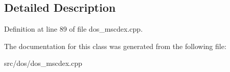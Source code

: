 \subsection{Detailed Description}


Definition at line 89 of file dos\-\_\-mscdex.\-cpp.



The documentation for this class was generated from the following file\-:\begin{DoxyCompactItemize}
\item 
src/dos/dos\-\_\-mscdex.\-cpp\end{DoxyCompactItemize}
